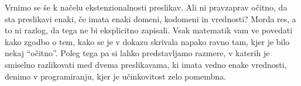Vrnimo se še k načelu ekstenzionalnosti preslikav. Ali ni pravzaprav očitno, da sta
preslikavi enaki, če imata enaki domeni, kodomeni in vrednosti? Morda res, a to ni razlog,
da tega ne bi eksplicitno zapisali. Vsak matematik vam ve povedati kako zgodbo o tem,
kako se je v dokazu skrivala napako ravno tam, kjer je bilo nekaj ``očitno''. Poleg tega
pa si lahko predstavljamo razmere, v katerih je smiselno razlikovati med dvema
preslikavama, ki imata vedno enake vrednosti, denimo v programiranju, kjer je učinkovitost
zelo pomembna.






